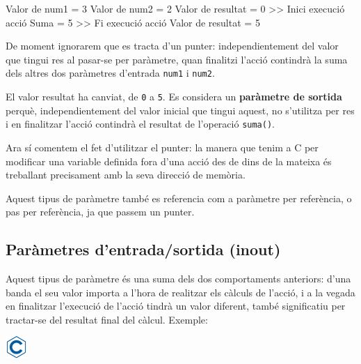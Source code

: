 \documentclass[
]{book}
\newenvironment{Shaded}{\begin{snugshade}}{\end{snugshade}}
\newcommand{\DecValTok}[1]{\textcolor[rgb]{0.00,0.00,0.81}{#1}}
\newcommand{\NormalTok}[1]{#1}
\begin{document}
\begin{Shaded}
\begin{Highlighting}[]
\NormalTok{Valor de num1 = }\DecValTok{3}
\NormalTok{Valor de num2 = }\DecValTok{2}
\NormalTok{Valor de resultat = }\DecValTok{0}
\NormalTok{\textgreater{}\textgreater{} Inici execució acció}
\NormalTok{Suma = }\DecValTok{5}
\NormalTok{\textgreater{}\textgreater{} Fi execució acció}
\NormalTok{Valor de resultat = }\DecValTok{5}
\end{Highlighting}
\end{Shaded}

De moment ignorarem que es tracta d'un punter: independientement del valor que tingui res al pasar-se per paràmetre, quan finalitzi l'acció contindrà la suma dels altres dos paràmetres d'entrada \texttt{num1} i \texttt{num2}.

El valor resultat ha canviat, de \texttt{0} a \texttt{5}. Es considera un \textbf{paràmetre de sortida} perquè, independientement del valor inicial que tingui aquest, no s'utilitza per res i en finalitzar l'acció contindrà el resultat de l'operació \texttt{suma()}.

Ara sí comentem el fet d'utilitzar el punter: la manera que tenim a C per modificar una variable definida fora d'una acció des de dins de la mateixa és treballant precisament amb la seva direcció de memòria.

Aquest tipus de paràmetre també es referencia com a paràmetre per referència, o pas per referència, ja que passem un punter.

\hypertarget{paruxe0metres-dentradasortida-inout}{%
\subsection{Paràmetres d'entrada/sortida (inout)}\label{paruxe0metres-dentradasortida-inout}}

Aquest tipus de paràmetre és una suma dels dos comportaments anteriors: d'una banda el seu valor importa a l'hora de realitzar els càlculs de l'acció, i a la vegada en finalitzar l'execució de l'acció tindrà un valor diferent, també significatiu per tractar-se del resultat final del càlcul. Exemple:

\includegraphics{./img/c.png}
\end{document}
